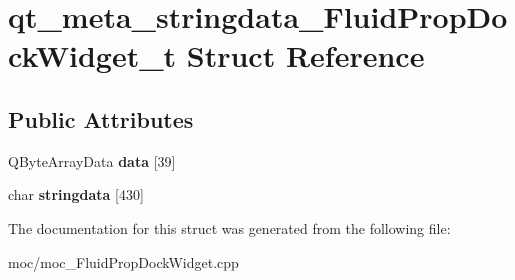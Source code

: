 \hypertarget{structqt__meta__stringdata___fluid_prop_dock_widget__t}{\section{qt\-\_\-meta\-\_\-stringdata\-\_\-\-Fluid\-Prop\-Dock\-Widget\-\_\-t Struct Reference}
\label{structqt__meta__stringdata___fluid_prop_dock_widget__t}
}
\subsection*{Public Attributes}
\begin{DoxyCompactItemize}
\item 
\hypertarget{structqt__meta__stringdata___fluid_prop_dock_widget__t_a45ad4242bbc119ba09818273a0237f04}{Q\-Byte\-Array\-Data {\bfseries data} \mbox{[}39\mbox{]}}\label{structqt__meta__stringdata___fluid_prop_dock_widget__t_a45ad4242bbc119ba09818273a0237f04}

\item 
\hypertarget{structqt__meta__stringdata___fluid_prop_dock_widget__t_a4199e59d6ea70287a93ba78fe0fdc05b}{char {\bfseries stringdata} \mbox{[}430\mbox{]}}\label{structqt__meta__stringdata___fluid_prop_dock_widget__t_a4199e59d6ea70287a93ba78fe0fdc05b}

\end{DoxyCompactItemize}


The documentation for this struct was generated from the following file\-:\begin{DoxyCompactItemize}
\item 
moc/moc\-\_\-\-Fluid\-Prop\-Dock\-Widget.\-cpp\end{DoxyCompactItemize}
